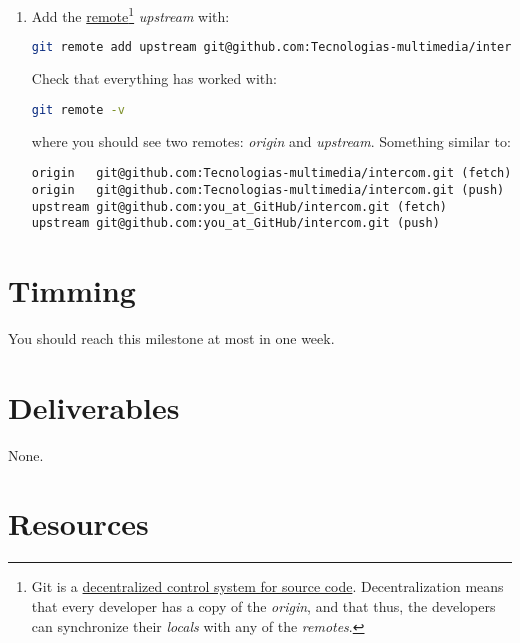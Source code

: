 \begin{enumerate}
\item Add the
  \href{https://docs.github.com/en/github/getting-started-with-github/github-glossary#remote}{remote}\footnote{Git
  is a
  \href{https://nvie.com/posts/a-successful-git-branching-model/}{decentralized
    control system for source code}. Decentralization means that every
  developer has a copy of the \emph{origin}, and that thus, the
  developers can synchronize their \emph{locals} with any of the
  \emph{remotes}.}  \emph{upstream} with:

  \begin{lstlisting}[language=bash]
    git remote add upstream git@github.com:Tecnologias-multimedia/intercom.git
  \end{lstlisting}

  Check that everything has worked with:

  \begin{lstlisting}[language=bash]  
    git remote -v
  \end{lstlisting}

  where you should see two remotes: \emph{origin} and \emph{upstream}. Something similar to:

\begin{verbatim}
origin   git@github.com:Tecnologias-multimedia/intercom.git (fetch)
origin   git@github.com:Tecnologias-multimedia/intercom.git (push)
upstream git@github.com:you_at_GitHub/intercom.git (fetch)
upstream git@github.com:you_at_GitHub/intercom.git (push)
\end{verbatim}

\end{enumerate}

\section{Timming}

You should reach this milestone at most in one week.

\section{Deliverables}

None.

\section{Resources}


